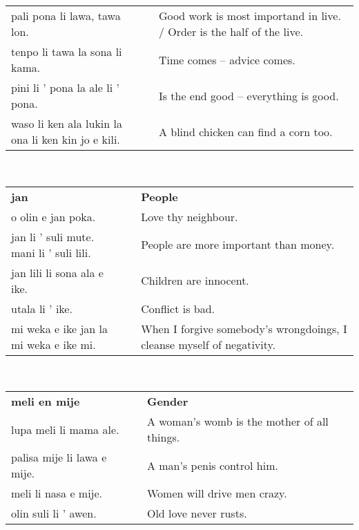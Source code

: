 \begin{supertabular}{p{6cm}|ll}
    pali pona li lawa, tawa lon.                       &  & Good work is most importand in live. / Order is the half of the live. \\
    tenpo li tawa la sona li kama.                     &  & Time comes -- advice comes.                                           \\
    pini li ' pona la ale li ' pona.                   &  & Is the end good -- everything is good.                                \\
    waso li ken ala lukin la ona li ken kin jo e kili. &  & A blind chicken can find a corn too.                                  \\
\end{supertabular} \\
%
\begin{supertabular}{p{6cm}|ll}
    \textbf{jan}                             &  & \textbf{People}                                                        \\
    o olin e jan poka.                       &  & Love thy neighbour.                                                    \\
    jan li ' suli mute. mani li ' suli lili. &  & People are more important than money.                                  \\
    jan lili li sona ala e ike.              &  & Children are innocent.                                                 \\
    utala li ' ike.                          &  & Conflict is bad.                                                       \\
    mi weka e ike jan la mi weka e ike mi.   &  & When I forgive somebody's wrongdoings, I cleanse myself of negativity. \\
\end{supertabular} \\
%
\begin{supertabular}{p{6cm}|ll}
    \textbf{meli en mije}       &  & \textbf{Gender}                             \\
    lupa meli li mama ale.      &  & A woman's womb is the mother of all things. \\
    palisa mije li lawa e mije. &  & A man's penis control him.                  \\
    meli li nasa e mije.        &  & Women will drive men crazy.                 \\
    olin suli li ' awen.        &  & Old love never rusts.                       \\
\end{supertabular} \\
